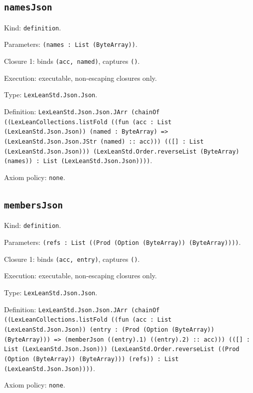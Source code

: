 \documentclass[11pt]{article}
\begin{document}
\subsection*{\texttt{namesJson}}
\noindent Kind: \texttt{definition}.\par
\noindent Parameters: \texttt{(names : List (ByteArray))}.\par
\noindent Closure 1: binds \texttt{(acc, named)}, captures \texttt{()}.\par
\noindent Execution: executable, non-escaping closures only.\par
\noindent Type: \texttt{LexLeanStd.Json.Json}.\par
\noindent Definition: \texttt{LexLeanStd.Json.Json.JArr (chainOf ((LexLeanCollections.listFold ((fun (acc : List (LexLeanStd.Json.Json)) (named : ByteArray) => (LexLeanStd.Json.Json.JStr (named) :: acc))) (([] : List (LexLeanStd.Json.Json))) (LexLeanStd.Order.reverseList (ByteArray) (names)) : List (LexLeanStd.Json.Json))))}.\par
\noindent Axiom policy: \texttt{none}.\par
\subsection*{\texttt{membersJson}}
\noindent Kind: \texttt{definition}.\par
\noindent Parameters: \texttt{(refs : List ((Prod (Option (ByteArray)) (ByteArray))))}.\par
\noindent Closure 1: binds \texttt{(acc, entry)}, captures \texttt{()}.\par
\noindent Execution: executable, non-escaping closures only.\par
\noindent Type: \texttt{LexLeanStd.Json.Json}.\par
\noindent Definition: \texttt{LexLeanStd.Json.Json.JArr (chainOf ((LexLeanCollections.listFold ((fun (acc : List (LexLeanStd.Json.Json)) (entry : (Prod (Option (ByteArray)) (ByteArray))) => (memberJson ((entry).1) ((entry).2) :: acc))) (([] : List (LexLeanStd.Json.Json))) (LexLeanStd.Order.reverseList ((Prod (Option (ByteArray)) (ByteArray))) (refs)) : List (LexLeanStd.Json.Json))))}.\par
\noindent Axiom policy: \texttt{none}.\par
\end{document}
